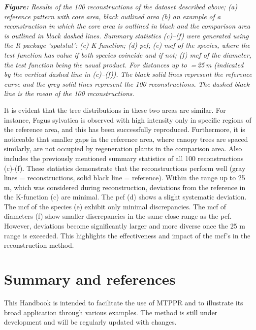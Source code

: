 \documentclass[
  letterpaper,
  DIV=11,
  numbers=noendperiod]{scrreprt}
\begin{document}
\emph{\textbf{Figure:} Results of the 100 reconstructions of the dataset
described above; (a) reference pattern with core area, black outlined
area (b) an example of a reconstruction in which the core area is
outlined in black and the comparison area is outlined in black dashed
lines. Summary statistics (c)--(f) were generated using the R package
`spatstat': (c) K function; (d) pcf; (e) mcf of the species, where the
test function has value if both species coincide and if not; (f) mcf of
the diameter, the test function being the usual product. For distances
up to  = 25 m (indicated by the vertical dashed line in (c)--(f)). The
black solid lines represent the reference curve and the grey solid lines
represent the 100 reconstructions. The dashed black line is the mean of
the 100 reconstructions.}

It is evident that the tree distributions in these two areas are
similar. For instance, Fagus sylvatica is observed with high intensity
only in specific regions of the reference area, and this has been
successfully reproduced. Furthermore, it is noticeable that smaller gaps
in the reference area, where canopy trees are spaced similarly, are not
occupied by regeneration plants in the comparison area. Also includes
the previously mentioned summary statistics of all 100 reconstructions
(c)-(f). These statistics demonstrate that the reconstructions perform
well (gray lines = reconstructions, solid black line = reference).
Within the range up to 25 m, which was considered during reconstruction,
deviations from the reference in the K-function (c) are minimal. The pcf
(d) shows a slight systematic deviation. The mcf of the species (e)
exhibit only minimal discrepancies. The mcf of diameters (f) show
smaller discrepancies in the same close range as the pcf. However,
deviations become significantly larger and more diverse once the 25 m
range is exceeded. This highlights the effectiveness and impact of the
mcf's in the reconstruction method.


\chapter{Summary and references}\label{summary-and-references}

This Handbook is intended to facilitate the use of MTPPR and to
illustrate its broad application through various examples. The method is
still under development and will be regularly updated with changes.
\end{document}
